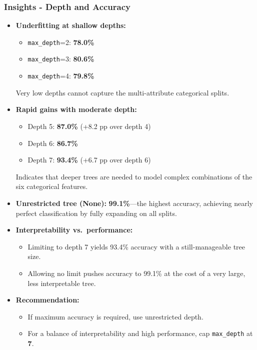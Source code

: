 \subsubsection*{Insights - Depth and Accuracy}
\begin{itemize}
	\item \textbf{Underfitting at shallow depths:}
	      \begin{itemize}
		      \item \texttt{max\_depth}=2: \textbf{78.0\%}
		      \item \texttt{max\_depth}=3: \textbf{80.6\%}
		      \item \texttt{max\_depth}=4: \textbf{79.8\%}
	      \end{itemize}
	      Very low depths cannot capture the multi-attribute categorical splits.
	\item \textbf{Rapid gains with moderate depth:}
	      \begin{itemize}
		      \item Depth 5: \textbf{87.0\%} (+8.2 pp over depth 4)
		      \item Depth 6: \textbf{86.7\%}
		      \item Depth 7: \textbf{93.4\%} (+6.7 pp over depth 6)
	      \end{itemize}
	      Indicates that deeper trees are needed to model complex combinations of the six categorical features.
	\item \textbf{Unrestricted tree (None):} \textbf{99.1\%}—the highest accuracy, achieving nearly perfect classification by fully expanding on all splits.
	\item \textbf{Interpretability vs.\ performance:}
	      \begin{itemize}
		      \item Limiting to depth 7 yields 93.4\% accuracy with a still-manageable tree size.
		      \item Allowing no limit pushes accuracy to 99.1\% at the cost of a very large, less interpretable tree.
	      \end{itemize}
	\item \textbf{Recommendation:}
	      \begin{itemize}
		      \item If maximum accuracy is required, use unrestricted depth.
		      \item For a balance of interpretability and high performance, cap \texttt{max\_depth} at \textbf{7}.
	      \end{itemize}
\end{itemize}
